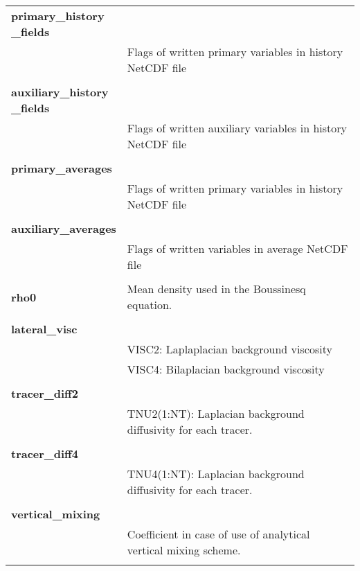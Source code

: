 \begin{longtable}{|p{0.25\linewidth}|p{0.75\linewidth}|}
\large{\textbf{primary\_history \_fields}} &     \\ 
&   Flags of written primary variables in history NetCDF file \\ 
&  \\ 

\large{\textbf{auxiliary\_history \_fields}} &     \\ 
&  Flags of written auxiliary variables in history NetCDF file \\ 
&  \\ 

\large{\textbf{primary\_averages}} &     \\ 
&  Flags of written primary variables in history NetCDF file \\ 
&  \\ 

\large{\textbf{auxiliary\_averages}} &     \\ 
&  Flags of written variables in average NetCDF file\\ 
&  \\ 

\large{\textbf{rho0}} & Mean density used in the Boussinesq equation. \\ 
&  \\  

\large{\textbf{lateral\_visc}} &     \\ 
&  VISC2: Laplaplacian background viscosity \\
&  VISC4: Bilaplacian  background viscosity \\
&  \\ 

\large{\textbf{tracer\_diff2}} &     \\ 
& TNU2(1:NT): Laplacian background diffusivity for  each tracer.  \\
&  \\ 

\large{\textbf{tracer\_diff4}} &     \\ 
& TNU4(1:NT): Laplacian background diffusivity for  each tracer.  \\
&  \\ 

\large{\textbf{vertical\_mixing}} &     \\ 
& Coefficient in case of use of analytical vertical mixing scheme.  \\ 
&  \\ 


\end{longtable}
